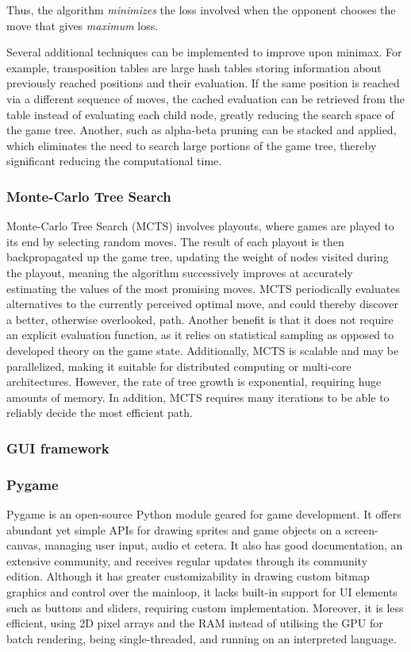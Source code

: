 \documentclass[../main/main.tex]{subfiles}
\begin{document}
Thus, the algorithm \textit{minimizes} the loss involved when the opponent chooses the move that gives \textit{maximum} loss.

Several additional techniques can be implemented to improve upon minimax. For example, transposition tables are large hash tables storing information about previously reached positions and their evaluation. If the same position is reached via a different sequence of moves, the cached evaluation can be retrieved from the table instead of evaluating each child node, greatly reducing the search space of the game tree. Another, such as alpha-beta pruning can be stacked and applied, which eliminates the need to search large portions of the game tree, thereby significant reducing the computational time.

\subsubsection*{Monte-Carlo Tree Search}
Monte-Carlo Tree Search (MCTS) involves playouts, where games are played to its end by selecting random moves. The result of each playout is then backpropagated up the game tree, updating the weight of nodes visited during the playout, meaning the algorithm successively improves at accurately estimating the values of the most promising moves. MCTS periodically evaluates alternatives to the currently perceived optimal move, and could thereby discover a better, otherwise overlooked, path. Another benefit is that it does not require an explicit evaluation function, as it relies on statistical sampling as opposed to developed theory on the game state. Additionally, MCTS is scalable and may be parallelized, making it suitable for distributed computing or multi-core architectures. However, the rate of tree growth is exponential, requiring huge amounts of memory. In addition, MCTS requires many iterations to be able to reliably decide the most efficient path.

\subsubsection{GUI framework}
\subsubsection*{Pygame}
Pygame is an open-source Python module geared for game development. It offers abundant yet simple APIs for drawing sprites and game objects on a screen-canvas, managing user input, audio et cetera. It also has good documentation, an extensive community, and receives regular updates through its community edition. Although it has greater customizability in drawing custom bitmap graphics and control over the mainloop, it lacks built-in support for UI elements such as buttons and sliders, requiring custom implementation. Moreover, it is less efficient, using 2D pixel arrays and the RAM instead of utilising the GPU for batch rendering, being single-threaded, and running on an interpreted language.
\end{document}
